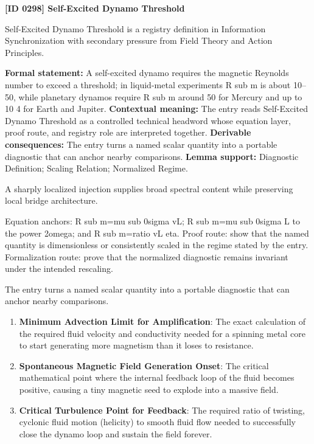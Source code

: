 \clearpage
\noindent\textbf{[ID 0298] Self-Excited Dynamo Threshold}\par
\vspace{0.35em}
\begingroup\small
{}
Self-Excited Dynamo Threshold is a registry definition in Information Synchronization with secondary pressure from Field Theory and Action Principles.

\begingroup\footnotesize\setlength{\emergencystretch}{3em}\sloppy
\textbf{Formal statement:} A self-excited dynamo requires the magnetic Reynolds number to exceed a threshold; in liquid-metal experiments R sub m is about 10--50, while planetary dynamos require R sub m around 50 for Mercury and up to 10 4 for Earth and Jupiter. \textbf{Contextual meaning:} The entry reads Self-Excited Dynamo Threshold as a controlled technical headword whose equation layer, proof route, and registry role are interpreted together. \textbf{Derivable consequences:} The entry turns a named scalar quantity into a portable diagnostic that can anchor nearby comparisons. \textbf{Lemma support:} Diagnostic Definition; Scaling Relation; Normalized Regime.\par
\endgroup

A sharply localized injection supplies broad spectral content while preserving local bridge architecture.

Equation anchors: R sub m=mu sub 0sigma vL; R sub m=mu sub 0sigma L to the power 2omega; and R sub m=ratio vL eta. Proof route: show that the named quantity is dimensionless or consistently scaled in the regime stated by the entry. Formalization route: prove that the normalized diagnostic remains invariant under the intended rescaling.

The entry turns a named scalar quantity into a portable diagnostic that can anchor nearby comparisons.
\endgroup

\begin{enumerate}[leftmargin=1.6em,itemsep=6pt,topsep=4pt]
\item \textbf{Minimum Advection Limit for Amplification}: The exact calculation of the required fluid velocity and conductivity needed for a spinning metal core to start generating more magnetism than it loses to resistance.
\item \textbf{Spontaneous Magnetic Field Generation Onset}: The critical mathematical point where the internal feedback loop of the fluid becomes positive, causing a tiny magnetic seed to explode into a massive field.
\item \textbf{Critical Turbulence Point for Feedback}: The required ratio of twisting, cyclonic fluid motion (helicity) to smooth fluid flow needed to successfully close the dynamo loop and sustain the field forever.
\end{enumerate}

